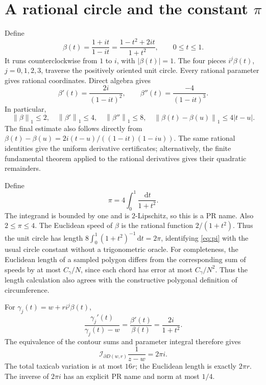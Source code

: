 \documentclass[11pt]{article}
\theoremstyle{definition}
\newcommand{\norm}[1]{\left\lVert#1\right\rVert_1}
\newcommand{\dd}{\,\mathrm d}
\newcommand{\Int}{\mathcal I}
\begin{document}
\section{A rational circle and the constant \texorpdfstring{\(\pi\)}{pi}}\label{sec:circle}

Define
\begin{equation}\label{eq:beta}
 \beta(t)=\frac{1+it}{1-it}
          =\frac{1-t^2+2it}{1+t^2},\qquad 0\le t\le1.
\end{equation}
It runs counterclockwise from \(1\) to \(i\), with \(|\beta(t)|=1\).
The four pieces \(i^j\beta(t)\), \(j=0,1,2,3\), traverse the positively
oriented unit circle. Every rational parameter gives rational coordinates.
Direct algebra gives
\[
 \beta'(t)=\frac{2i}{(1-it)^2},\qquad
 \beta''(t)=\frac{-4}{(1-it)^3}.
\]
In particular,
\begin{equation}\label{eq:betabounds}
 \norm\beta\le2,\quad \norm{\beta'}\le4,\quad
 \norm{\beta''}\le8,\quad
 \norm{\beta(t)-\beta(u)}\le4|t-u|.
\end{equation}
The final estimate also follows directly from
\(\beta(t)-\beta(u)=2i(t-u)/((1-it)(1-iu))\).
The same rational identities give the uniform derivative certificates;
alternatively, the finite fundamental theorem applied to the rational
derivatives gives their quadratic remainders.

Define
\begin{equation}\label{eq:pi}
 \pi=4\int_0^1\frac{\dd t}{1+t^2}.
\end{equation}
The integrand is bounded by one and is \(2\)-Lipschitz, so this is a PR
name. Also \(2\le\pi\le4\). The Euclidean speed of \(\beta\) is the rational
function \(2/(1+t^2)\). Thus the unit circle has length
\(8\int_0^1(1+t^2)^{-1}\dd t=2\pi\), identifying \eqref{eq:pi} with the
usual circle constant without a trigonometric oracle.
For completeness, the Euclidean length of a sampled polygon differs from
the corresponding sum of speeds by at most \(C_\gamma/N\), since each
chord has error at most \(C_\gamma/N^2\). Thus the length calculation also
agrees with the constructive polygonal definition of circumference.

For \(\gamma_j(t)=w+ri^j\beta(t)\),
\[
 \frac{\gamma_j'(t)}{\gamma_j(t)-w}
       =\frac{\beta'(t)}{\beta(t)}=\frac{2i}{1+t^2}.
\]
The equivalence of the contour sums and parameter integral therefore gives
\begin{equation}\label{eq:kernel}
 \Int_{\partial D(w,r)}\frac1{z-w}=2\pi i.
\end{equation}
The total taxicab variation is at most \(16r\); the Euclidean length is
exactly \(2\pi r\). The inverse of \(2\pi i\) has an explicit PR name and
norm at most \(1/4\).
\end{document}
